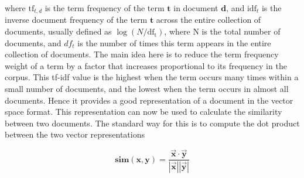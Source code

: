 where $\mathrm{tf}_{t, d}$ is the term frequency of the term $\mathbf{t}$ in document $\mathbf{d}$, and $\mathrm{idf}_{t}$ is the inverse document frequency of the term $\mathbf{t}$ across the entire collection of documents, usually defined as $\log(N / \mathrm{df_{t}})$, where $\mathrm{N}$ is the total number of documents, and $df_{t}$ is the number of times this term appears in the entire collection of documents. The main idea here is to reduce the term frequency weight of a term by a factor that increases proportional to its frequency in the corpus. This tf-idf value is the highest when the term occurs many times within a small number of documents, and the lowest when the term occurs in almost all documents. Hence it provides a good representation of a document in the vector space format. This representation can now be used to calculate the similarity between two documents. The standard way for this is to compute the dot product between the two vector representations

$$\mathbf{sim(x, y)} = \frac{\vec{\mathbf{x}} \cdot \vec{\mathbf{y}}}{|\vec{\mathbf{x}}| | \vec{\mathbf{y}}|}$$
